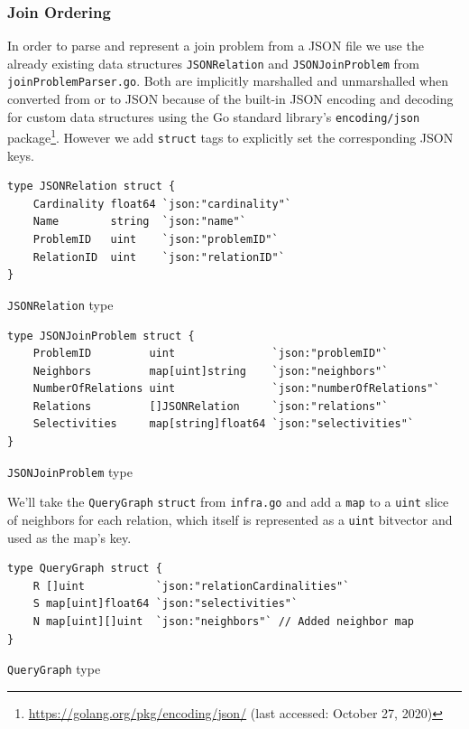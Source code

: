 \subsubsection{Join Ordering}
In order to parse and represent a join problem from a JSON file we use the already existing data structures \texttt{JSONRelation} and \texttt{JSONJoinProblem} from \texttt{joinProblemParser.go}. Both are implicitly marshalled and unmarshalled when converted from or to JSON because of the built-in JSON encoding and decoding for custom data structures using the Go standard library's \texttt{encoding/json} package\footnote{\url{https://golang.org/pkg/encoding/json/} (last accessed: October 27, 2020)}. However we add \texttt{struct} tags to explicitly set the corresponding JSON keys.
\vspace{0.6cm}

\begin{code}
\begin{verbatim}
type JSONRelation struct {
    Cardinality float64 `json:"cardinality"`
    Name        string  `json:"name"`
    ProblemID   uint    `json:"problemID"`
    RelationID  uint    `json:"relationID"`
}
\end{verbatim}
\caption{\texttt{JSONRelation} type}
\end{code}
\vspace{0.6cm}

\begin{code}
\begin{verbatim}
type JSONJoinProblem struct {
    ProblemID         uint               `json:"problemID"`
    Neighbors         map[uint]string    `json:"neighbors"`
    NumberOfRelations uint               `json:"numberOfRelations"`
    Relations         []JSONRelation     `json:"relations"`
    Selectivities     map[string]float64 `json:"selectivities"`
}
\end{verbatim}
\caption{\texttt{JSONJoinProblem} type}
\end{code}
\vspace{0.8cm}

We'll take the \texttt{QueryGraph} \texttt{struct} from \texttt{infra.go} and add a \texttt{map} to a \texttt{uint} slice of neighbors for each relation, which itself is represented as a \texttt{uint} bitvector and used as the map's key.

\begin{code}
\begin{verbatim}
type QueryGraph struct {
	R []uint           `json:"relationCardinalities"`
	S map[uint]float64 `json:"selectivities"`
	N map[uint][]uint  `json:"neighbors"` // Added neighbor map
}
\end{verbatim}
\caption{\texttt{QueryGraph} type}
\end{code}
\vspace{0.8cm}



